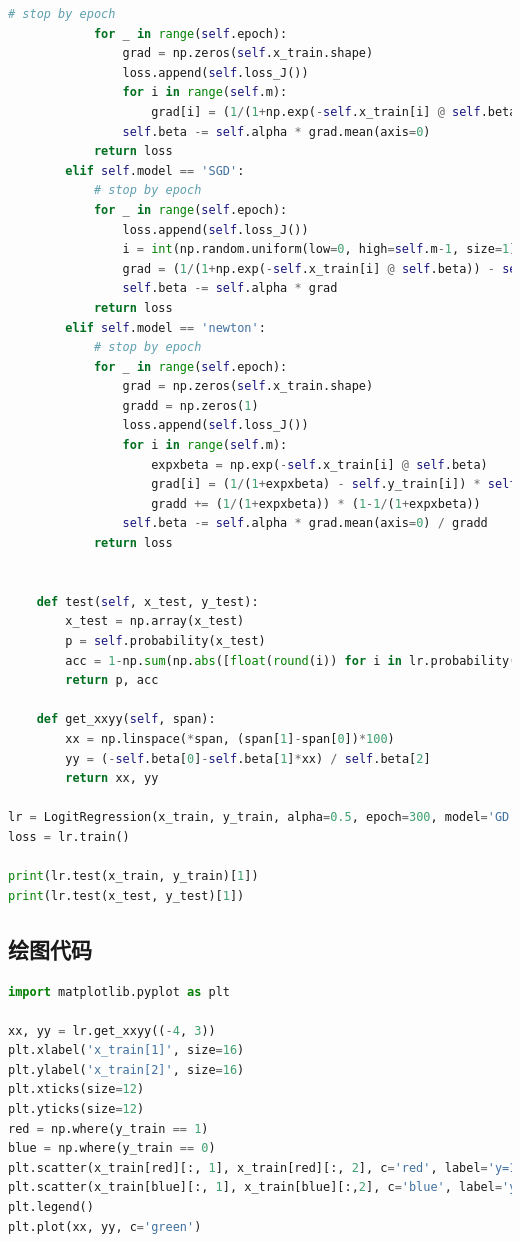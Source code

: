 \documentclass[UTF8]{article}
\begin{document}
\begin{lstlisting}[language=python, caption=对率回归算法代码]
            # stop by epoch
            for _ in range(self.epoch):
                grad = np.zeros(self.x_train.shape)
                loss.append(self.loss_J())
                for i in range(self.m):
                    grad[i] = (1/(1+np.exp(-self.x_train[i] @ self.beta)) - self.y_train[i]) * self.x_train[i]
                self.beta -= self.alpha * grad.mean(axis=0)
            return loss
        elif self.model == 'SGD':
            # stop by epoch
            for _ in range(self.epoch):
                loss.append(self.loss_J())
                i = int(np.random.uniform(low=0, high=self.m-1, size=1))
                grad = (1/(1+np.exp(-self.x_train[i] @ self.beta)) - self.y_train[i]) * self.x_train[i]
                self.beta -= self.alpha * grad
            return loss
        elif self.model == 'newton':
            # stop by epoch
            for _ in range(self.epoch):
                grad = np.zeros(self.x_train.shape)
                gradd = np.zeros(1)
                loss.append(self.loss_J())
                for i in range(self.m):
                    expxbeta = np.exp(-self.x_train[i] @ self.beta)
                    grad[i] = (1/(1+expxbeta) - self.y_train[i]) * self.x_train[i]
                    gradd += (1/(1+expxbeta)) * (1-1/(1+expxbeta))
                self.beta -= self.alpha * grad.mean(axis=0) / gradd
            return loss
            
            
    def test(self, x_test, y_test):
        x_test = np.array(x_test)
        p = self.probability(x_test)
        acc = 1-np.sum(np.abs([float(round(i)) for i in lr.probability(x_test)] - y_test)) / len(y_test)
        return p, acc
    
    def get_xxyy(self, span):
        xx = np.linspace(*span, (span[1]-span[0])*100)
        yy = (-self.beta[0]-self.beta[1]*xx) / self.beta[2]
        return xx, yy

lr = LogitRegression(x_train, y_train, alpha=0.5, epoch=300, model='GD')
loss = lr.train()

print(lr.test(x_train, y_train)[1])
print(lr.test(x_test, y_test)[1])
\end{lstlisting}
\subsection{绘图代码}
\begin{lstlisting}[language=python, caption=绘图代码]
import matplotlib.pyplot as plt

xx, yy = lr.get_xxyy((-4, 3))
plt.xlabel('x_train[1]', size=16)
plt.ylabel('x_train[2]', size=16)
plt.xticks(size=12)
plt.yticks(size=12)
red = np.where(y_train == 1)
blue = np.where(y_train == 0)
plt.scatter(x_train[red][:, 1], x_train[red][:, 2], c='red', label='y=1')
plt.scatter(x_train[blue][:, 1], x_train[blue][:,2], c='blue', label='y=0')
plt.legend()
plt.plot(xx, yy, c='green')
\end{lstlisting}
\end{document}
